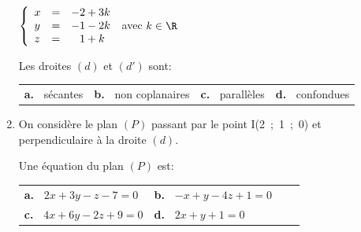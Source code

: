 \begin{enumerate}
$\left\{\begin{array}{l c l}
x&=&- 2 + 3k\\y&=&- 1 - 2k\\
z&=&\phantom{-}1 + k
\end{array}\right.$ avec $k \in \R$

Les droites $(d)$ et $(d')$ sont:

\begin{center}
\begin{tabularx}{\linewidth}{*{4}{X}}
\textbf{a.~} sécantes &\textbf{b.~} non coplanaires&\textbf{c.~}  parallèles&\textbf{d.~} confondues
\end{tabularx}
\end{center}
\item On considère le plan $(P)$ passant par le point I(2~;~1~;~0) et perpendiculaire à la droite $(d)$.

Une équation du plan $(P)$ est:

\begin{center}
\begin{tabularx}{\linewidth}{*{4}{X}}
\textbf{a.~} $2x + 3y - z - 7=0$	&\textbf{b.~} $- x + y - 4z + 1 = 0$\\
\textbf{c.~} $4x + 6y - 2z + 9 = 0$	&\textbf{d.~} $2x + y + 1 = 0$
\end{tabularx}
\end{center}

\end{enumerate}

\bigskip
